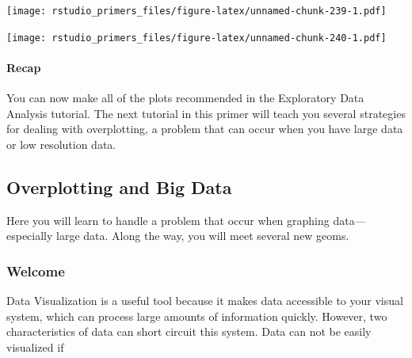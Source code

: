 \documentclass[
]{article}
\newenvironment{Shaded}{\begin{snugshade}}{\end{snugshade}}
\newcommand{\AttributeTok}[1]{\textcolor[rgb]{0.77,0.63,0.00}{#1}}
\newcommand{\FunctionTok}[1]{\textcolor[rgb]{0.00,0.00,0.00}{#1}}
\newcommand{\NormalTok}[1]{#1}
\newcommand{\SpecialCharTok}[1]{\textcolor[rgb]{0.00,0.00,0.00}{#1}}
\newcommand{\StringTok}[1]{\textcolor[rgb]{0.31,0.60,0.02}{#1}}
\begin{document}
\texttt{[image: rstudio\_primers\_files/figure-latex/unnamed-chunk-239-1.pdf]}

\begin{Shaded}
\end{Shaded}

\texttt{[image: rstudio\_primers\_files/figure-latex/unnamed-chunk-240-1.pdf]}

\hypertarget{recap-7}{%
\paragraph{Recap}\label{recap-7}}

You can now make all of the plots recommended in the Exploratory Data
Analysis tutorial. The next tutorial in this primer will teach you
several strategies for dealing with overplotting, a problem that can
occur when you have large data or low resolution data.

\hypertarget{overplotting-and-big-data}{%
\subsection{Overplotting and Big Data}\label{overplotting-and-big-data}}

Here you will learn to handle a problem that occur when graphing
data---especially large data. Along the way, you will meet several new
geoms.

\hypertarget{welcome-11}{%
\subsubsection{Welcome}\label{welcome-11}}

Data Visualization is a useful tool because it makes data accessible to
your visual system, which can process large amounts of information
quickly. However, two characteristics of data can short circuit this
system. Data can not be easily visualized if
\end{document}
